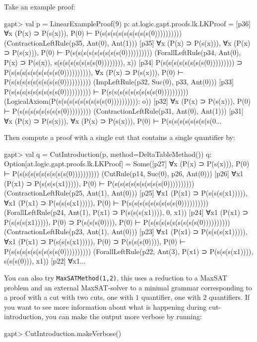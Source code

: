 \documentclass[a4paper,11pt]{article}
\begin{document}
Take an example proof:
\begin{clilisting}
gapt> val p = LinearExampleProof(9)
p: at.logic.gapt.proofs.lk.LKProof =
[p36] ∀x (P(x) ⊃ P(s(x))), P(0) ⊢ P(s(s(s(s(s(s(s(s(s(0))))))))))    (ContractionLeftRule(p35, Ant(0), Ant(1)))
[p35] ∀x (P(x) ⊃ P(s(x))), ∀x (P(x) ⊃ P(s(x))), P(0) ⊢ P(s(s(s(s(s(s(s(s(s(0))))))))))    (ForallLeftRule(p34, Ant(0), P(x) ⊃ P(s(x)), s(s(s(s(s(s(s(s(0)))))))), x))
[p34] P(s(s(s(s(s(s(s(s(0))))))))) ⊃ P(s(s(s(s(s(s(s(s(s(0)))))))))),
∀x (P(x) ⊃ P(s(x))),
P(0)
⊢
P(s(s(s(s(s(s(s(s(s(0))))))))))    (ImpLeftRule(p32, Suc(0), p33, Ant(0)))
[p33] P(s(s(s(s(s(s(s(s(s(0)))))))))) ⊢ P(s(s(s(s(s(s(s(s(s(0))))))))))    (LogicalAxiom(P(s(s(s(s(s(s(s(s(s(0)))))))))): o))
[p32] ∀x (P(x) ⊃ P(s(x))), P(0) ⊢ P(s(s(s(s(s(s(s(s(0)))))))))    (ContractionLeftRule(p31, Ant(0), Ant(1)))
[p31] ∀x (P(x) ⊃ P(s(x))), ∀x (P(x) ⊃ P(s(x))), P(0) ⊢ P(s(s(s(s(s(s(s(s(0...

\end{clilisting}
Then compute a proof with a single cut that contains a single quantifier by:
\begin{clilisting}
gapt> val q = CutIntroduction(p, method=DeltaTableMethod())
q: Option[at.logic.gapt.proofs.lk.LKProof] =
Some([p27] ∀x (P(x) ⊃ P(s(x))), P(0) ⊢ P(s(s(s(s(s(s(s(s(s(0))))))))))    (CutRule(p14, Suc(0), p26, Ant(0)))
[p26] ∀x1 (P(x1) ⊃ P(s(s(s(x1))))), P(0) ⊢ P(s(s(s(s(s(s(s(s(s(0))))))))))    (ContractionLeftRule(p25, Ant(1), Ant(0)))
[p25] ∀x1 (P(x1) ⊃ P(s(s(s(x1))))),
∀x1 (P(x1) ⊃ P(s(s(s(x1))))),
P(0)
⊢
P(s(s(s(s(s(s(s(s(s(0))))))))))    (ForallLeftRule(p24, Ant(1), P(x1) ⊃ P(s(s(s(x1)))), 0, x1))
[p24] ∀x1 (P(x1) ⊃ P(s(s(s(x1))))),
P(0) ⊃ P(s(s(s(0)))),
P(0)
⊢
P(s(s(s(s(s(s(s(s(s(0))))))))))    (ContractionLeftRule(p23, Ant(1), Ant(0)))
[p23] ∀x1 (P(x1) ⊃ P(s(s(s(x1))))),
∀x1 (P(x1) ⊃ P(s(s(s(x1))))),
P(0) ⊃ P(s(s(s(0)))),
P(0)
⊢
P(s(s(s(s(s(s(s(s(s(0))))))))))    (ForallLeftRule(p22, Ant(3), P(x1) ⊃ P(s(s(s(x1)))), s(s(s(0))), x1))
[p22] ∀x1...

\end{clilisting}

You can also try \texttt{MaxSATMethod(1,2)}, this uses a reduction to a MaxSAT
problem and an external MaxSAT-solver to a
minimal grammar corresponding to a proof with a cut with two cuts, one with $1$
quantifier, one with $2$ quantifiers.  If you want to see more information
about what is happening during cut-introduction, you can make the output more
verbose by running:

\begin{clilisting}
gapt> CutIntroduction.makeVerbose()

\end{clilisting}
\end{document}
